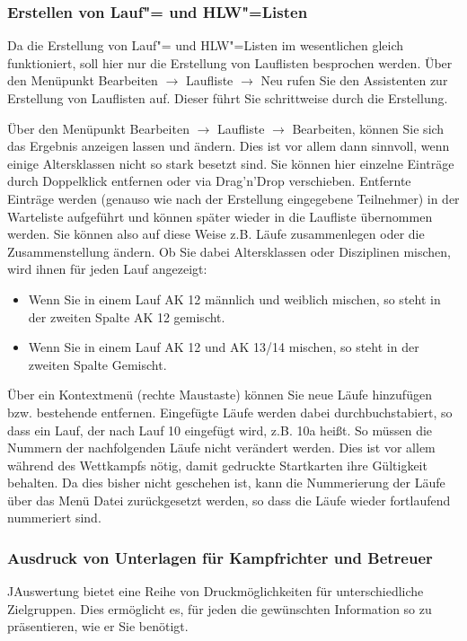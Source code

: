 \documentclass[11pt,a4paper,twoside,ngerman]{article}
\begin{document}
\subsubsection*{Erstellen von Lauf"= und HLW"=Listen}
Da die Erstellung von Lauf"= und HLW"=Listen im wesentlichen gleich funktioniert, soll hier nur die Erstellung von Lauflisten besprochen werden. Über den Menüpunkt \glqq{}Bearbeiten\grqq{} \ensuremath{\rightarrow} \glqq{}Laufliste\grqq{} \ensuremath{\rightarrow} \glqq{}Neu\grqq{} rufen Sie den Assistenten zur Erstellung von Lauflisten auf. Dieser führt Sie schrittweise durch die Erstellung. 

Über den Menüpunkt \glqq{}Bearbeiten\grqq{} \ensuremath{\rightarrow} \glqq{}Laufliste\grqq{} \ensuremath{\rightarrow} \glqq{}Bearbeiten\grqq{}, können Sie sich das Ergebnis anzeigen lassen und ändern. Dies ist vor allem dann sinnvoll, wenn einige Altersklassen nicht so stark besetzt sind. Sie können hier einzelne Einträge durch Doppelklick entfernen oder via Drag'n'Drop verschieben. Entfernte Einträge werden (genauso wie nach der Erstellung eingegebene Teilnehmer) in der Warteliste aufgeführt und können später wieder in die Laufliste übernommen werden. Sie können also auf diese Weise z.B. Läufe zusammenlegen oder die Zusammenstellung ändern. Ob Sie dabei Altersklassen oder Disziplinen mischen, wird ihnen für jeden Lauf angezeigt:
\begin{itemize}

\item Wenn Sie in einem Lauf AK 12 männlich und weiblich mischen, so steht in der zweiten Spalte \glqq{}AK 12 gemischt\grqq{}.


\item Wenn Sie in einem Lauf AK 12 und AK 13/14 mischen, so steht in der zweiten Spalte \glqq{}Gemischt\grqq{}.


\end{itemize}


Über ein Kontextmenü (rechte Maustaste) können Sie neue Läufe hinzufügen bzw. bestehende entfernen. Eingefügte Läufe werden dabei durchbuchstabiert, so dass ein Lauf, der nach Lauf 10 eingefügt wird, z.B. 10a heißt. So müssen die Nummern der nachfolgenden Läufe nicht verändert werden. Dies ist vor allem während des Wettkampfs nötig, damit gedruckte Startkarten ihre Gültigkeit behalten. Da dies bisher nicht geschehen ist, kann die Nummerierung der Läufe über das Menü \glqq{}Datei\grqq{} zurückgesetzt werden, so dass die Läufe wieder fortlaufend nummeriert sind.


\subsubsection*{Ausdruck von Unterlagen für Kampfrichter und Betreuer}
JAuswertung bietet eine Reihe von Druckmöglichkeiten für unterschiedliche Zielgruppen. Dies ermöglicht es, für jeden die gewünschten Information so zu präsentieren, wie er Sie benötigt.
\end{document}
